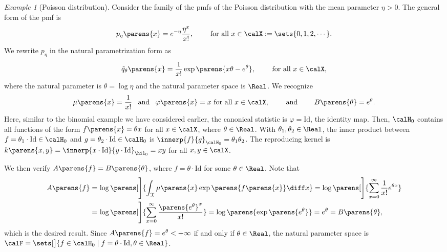 \documentclass[12pt]{article}
\theoremstyle{definition}
\theoremstyle{theorem}
\theoremstyle{remark}
\newtheorem{example}{Example}
\begin{document}

\begin{example}[Poisson distribution]
	Consider the family of the pmfs of the Poisson distribution with the mean parameter $\eta > 0$. The general form of the pmf is 
	\begin{align*}
		p_{\eta} \parens{x} = e^{-\eta} \frac{\eta^x}{x!}, \qquad \text{ for all } x \in \calX := \sets{0, 1, 2, \cdots}.  
	\end{align*}
	We rewrite $p_{\eta}$ in the natural parametrization form as 
	\begin{align}
		\tilde{q}_{\theta} \parens{x} = \frac{1}{x!} \exp \parens{x \theta - e^{\theta}}, \qquad \text{ for all } x \in \calX, 
	\end{align}
	where the natural parameter is $\theta = \log \eta$ and the natural parameter space is $\Real$. We recognize 
	\begin{align*}
		\mu \parens{x} = \frac{1}{x!} \enspace \text{ and } \enspace \varphi \parens{x} = x \text{ for all } x \in \calX, \qquad \text{ and } \qquad B \parens{\theta} = e^\theta. 
		\end{align*}
	Here, similar to the binomial example we have considered earlier, the canonical statistic is $\varphi = \mathrm{Id}$, the identity map. Then, $\calH_0$ contains all functions of the form $f \parens{x} = \theta x$ for all $x \in \calX$, where $\theta \in \Real$. With $\theta_1, \theta_2 \in \Real$, the inner product between $f = \theta_1 \cdot \mathrm{Id} \in \calH_0$ and $g = \theta_2 \cdot \mathrm{Id} \in \calH_0$ is $\innerp{f}{g}_{\calH_0} = \theta_1 \theta_2$. The reproducing kernel is $k \parens{x, y} = \innerp{x \cdot \mathrm{Id}}{y \cdot \mathrm{Id} }_{\hil_0} = x y$ for all $x, y \in \calX$. 
	
	We then verify $A \parens{f} = B \parens{\theta}$, where $f = \theta \cdot \mathrm{Id}$ for some $\theta \in \Real$. Note that 
	\begin{align*}
		A \parens{f} = & \, \log \parens[\Bigg]{\int_{\mathcal{X}} \mu \parens{x} \exp \parens{f \parens{x}} \diff x} 
		= \log \parens[\Bigg]{\sum_{x=0}^{\infty} \frac{1}{x!} e^{\theta x}} \\ 
		= & \, \log \parens[\Bigg]{\sum_{x=0}^{\infty} \frac{\parens{e^{\theta}}^x}{x!} } 
		= \log \parens{\exp \parens{e^\theta}} = e^\theta = B \parens{\theta}, 
	\end{align*}
	which is the desired result. Since $A \parens{f} = e^{\theta} < + \infty$ if and only if $\theta \in \Real$, the natural parameter space is $\calF = \sets[\big]{f \in \calH_0 \mid f = \theta \cdot \mathrm{Id}, \theta \in \Real}$. 
\end{example}
\end{document}
